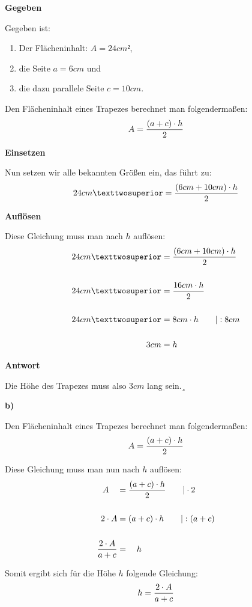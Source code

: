 \documentclass[
  ngerman,
]{book}
\providecommand{\tightlist}{%
  \setlength{\itemsep}{0pt}\setlength{\parskip}{0pt}}
\begin{document}
\textbf{Gegeben}

Gegeben ist:

\begin{enumerate}
\def\labelenumi{\arabic{enumi}.}
\tightlist
\item
  Der Flächeninhalt: \(A=24cm²\),
\item
  die Seite \(a=6cm\) und
\item
  die dazu parallele Seite \(c=10cm\).
\end{enumerate}

Den Flächeninhalt eines Trapezes berechnet man folgendermaßen:
\[ A = {(a+c) \cdot h \over 2} \]

\textbf{Einsetzen}

Nun setzen wir alle bekannten Größen ein, das führt zu:
\[ 24 cm² = {(6cm + 10 cm) \cdot h \over 2} \]

\textbf{Auflösen}

Diese Gleichung muss man nach \(h\) auflösen:
\[ \begin{align} 24 cm² &= {(6cm + 10 cm) \cdot h \over 2}\\
{}\\
24cm² &= {16cm \cdot h \over 2} \\
{}\\
24cm² &= 8cm \cdot h \quad\quad |:8cm\\
{}\\
3cm &=h\end{align} \]

\textbf{Antwort}

Die Höhe des Trapezes muss also \(3cm\) lang sein.¸

\textbf{b)}

Den Flächeninhalt eines Trapezes berechnet man folgendermaßen:
\[ A = {(a+c) \cdot h \over 2} \]

Diese Gleichung muss man nun nach \(h\) auflösen:
\[\begin{align} A \quad &= {(a+c) \cdot h \over 2} \quad\quad | \cdot 2\\
          {}\\
        2 \cdot A &= (a+c) \cdot h \quad\quad |:(a+c) \\
          {}\\
        {2 \cdot A} \over {a+c} &= \quad h
\end{align}\]

Somit ergibt sich für die Höhe \(h\) folgende Gleichung:
\[h = {2 \cdot A \over a+c}\]

\hypertarget{section-13}{%
\subsubsection*{}\label{section-13}}
\end{document}
